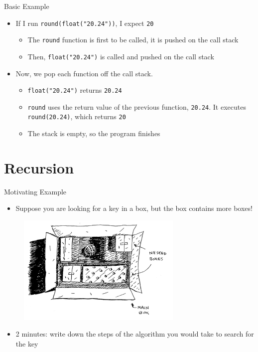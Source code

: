 \documentclass[
  ignorenonframetext,
]{beamer}
\providecommand{\tightlist}{%
  \setlength{\itemsep}{0pt}\setlength{\parskip}{0pt}}\usepackage{longtable,booktabs,array}
\begin{document}
\begin{frame}[fragile]{Basic Example}
\protect\hypertarget{basic-example}{}
\begin{itemize}
\item
  If I run \texttt{round(float("20.24"))}, I expect \texttt{20}

  \begin{itemize}
  \item
    The \texttt{round} function is first to be called, it is pushed on
    the call stack
  \item
    Then, \texttt{float("20.24")} is called and pushed on the call stack
  \end{itemize}
\item
  Now, we pop each function off the call stack.

  \begin{itemize}
  \item
    \texttt{float("20.24")} returns \texttt{20.24}
  \item
    \texttt{round} uses the return value of the previous function,
    \texttt{20.24}. It executes \texttt{round(20.24)}, which returns
    \texttt{20}
  \item
    The stack is empty, so the program finishes
  \end{itemize}
\end{itemize}
\end{frame}

\hypertarget{recursion}{%
\section{Recursion}\label{recursion}}

\begin{frame}{Motivating Example}
\protect\hypertarget{motivating-example}{}
\begin{itemize}
\tightlist
\item
  Suppose you are looking for a key in a box, but the box contains more
  boxes!
\end{itemize}

\begin{figure}

{\centering \includegraphics[width=7.9cm,height=\textheight]{images/box-recursion.png}

}

\end{figure}

\begin{itemize}
\tightlist
\item
  2 minutes: write down the steps of the algorithm you would take to
  search for the key
\end{itemize}
\end{frame}
\end{document}
